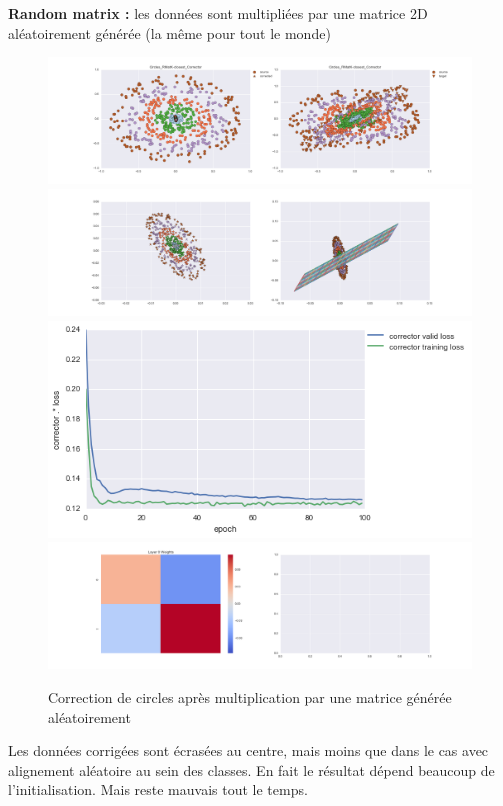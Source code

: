 {\Large \textbf{Random matrix :}} les données sont multipliées par une matrice 2D aléatoirement générée
 (la même pour tout le monde)

\begin{figure}[H] %
\centering
\includegraphics[width=\linewidth]{fig/24-05-2016/circles/Circles_RMatK-closest_Corrector-DATA.png}
\includegraphics[width=\linewidth]{fig/24-05-2016/circles/Circles_RMatK-closest_Corrector-GridCheck.png}
\includegraphics[width=0.45\linewidth]{fig/24-05-2016/circles/Circles_RMatK-closest_Corrector-Learning_curve.png}
\includegraphics[width=\linewidth]{fig/24-05-2016/circles/Circles_RMatK-closest_Corrector-W.png}
\caption{Correction de circles après multiplication par une matrice générée aléatoirement}
\label{fig:recap-circles-RMat-exhaustive}
\end{figure}

Les données corrigées sont écrasées au centre, mais moins que dans le cas avec alignement
aléatoire au sein des classes. En fait le résultat dépend beaucoup de l'initialisation.
Mais reste mauvais tout le temps.


